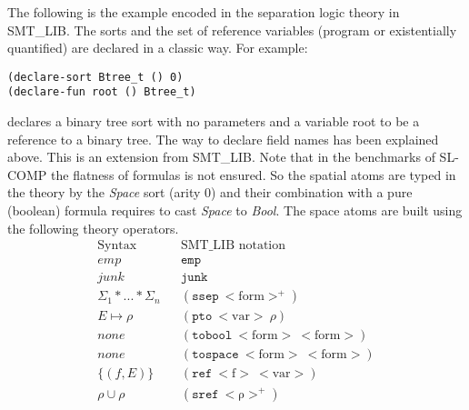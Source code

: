 \documentclass{article}
\theoremstyle{plain}
\begin{document}
The following is the example encoded in the separation logic theory in SMT\_LIB. 
The sorts and the set of reference variables (program or existentially quantified) are declared in a classic way. For example:
\begin{verbatim}
(declare-sort Btree_t () 0)
(declare-fun root () Btree_t)
\end{verbatim}
declares a binary tree sort with no parameters and a variable root to be a reference to a binary tree.
The way to declare field names has been explained above. This is an extension from SMT\_LIB.
Note that in the benchmarks of SL-COMP the flatness of formulas is not ensured. 
So the spatial atoms are typed in the theory by the \textit{Space} sort (arity 0) and their combination with a pure (boolean) formula requires to cast \textit{Space} to \textit{Bool}.
The space atoms are built using the following theory operators.
\begin{equation*}
\begin{array}{ccc}
\text{Syntax} & &\text{SMT\_LIB notation} \\ 
\hline
emp & &\mathtt{emp}  \\ 
junk & &\mathtt{junk} \\ 
\Sigma_1*...*\Sigma_n & &\mathtt{(ssep\ \mathrm{<form>^{+}})}  \\ 
E \mapsto \rho & &\mathtt{(pto\ \mathrm{<var>}\ \rho)} \\ 
none & &\mathtt{(tobool\ \mathrm{<form>\ <form>})} \\
none & &\mathtt{(tospace\ \mathrm{<form>\ <form>})}\\
\{(f,E)\} & &\mathtt{(ref\ \mathrm{<f>\ <var>})}\\
\rho \cup\rho &  &\mathtt{(sref\ \mathrm{<\rho>^{+}})}
\end{array} 
\end{equation*}
\end{document}
